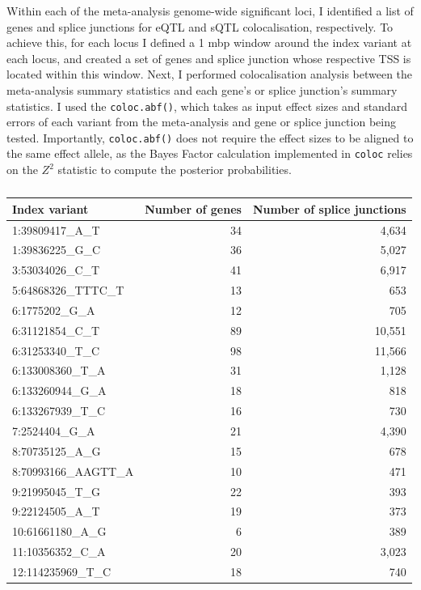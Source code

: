Within each of the meta-analysis genome-wide significant loci, I identified a list of genes and splice junctions for eQTL and sQTL colocalisation, respectively. To achieve this, for each locus I defined a 1 mbp window around the index variant at each locus, and created a set of genes and splice junction whose respective TSS is located within this window. Next, I performed colocalisation analysis between the meta-analysis summary statistics and each gene's or splice junction's summary statistics. I used the \Verb+coloc.abf()+, which takes as input effect sizes and standard errors of each variant from the meta-analysis and gene or splice junction being tested. Importantly, \Verb+coloc.abf()+ does not require the effect sizes to be aligned to the same effect allele, as the Bayes Factor calculation implemented in \Verb+coloc+ relies on the $Z^{2}$ statistic to compute the posterior probabilities.

\begin{table}[H]

  \caption{}
  \label{table:num_egenes_sgenes}
  \centering
  \begin{tabular}[t]{|l|r|r|}
  \hline
  Index variant & Number of genes & Number of splice junctions\\
  \hline
  1:39809417\_A\_T & 34 & 4,634\\
  \hline
  1:39836225\_G\_C & 36 & 5,027\\
  \hline
  3:53034026\_C\_T & 41 & 6,917\\
  \hline
  5:64868326\_TTTC\_T & 13 & 653\\
  \hline
  6:1775202\_G\_A & 12 & 705\\
  \hline
  6:31121854\_C\_T & 89 & 10,551\\
  \hline
  6:31253340\_T\_C & 98 & 11,566\\
  \hline
  6:133008360\_T\_A & 31 & 1,128\\
  \hline
  6:133260944\_G\_A & 18 & 818\\
  \hline
  6:133267939\_T\_C & 16 & 730\\
  \hline
  7:2524404\_G\_A & 21 & 4,390\\
  \hline
  8:70735125\_A\_G & 15 & 678\\
  \hline
  8:70993166\_AAGTT\_A & 10 & 471\\
  \hline
  9:21995045\_T\_G & 22 & 393\\
  \hline
  9:22124505\_A\_T & 19 & 373\\
  \hline
  10:61661180\_A\_G & 6 & 389\\
  \hline
  11:10356352\_C\_A & 20 & 3,023\\
  \hline
  12:114235969\_T\_C & 18 & 740\\
  \hline
  \end{tabular}
  \end{table}



